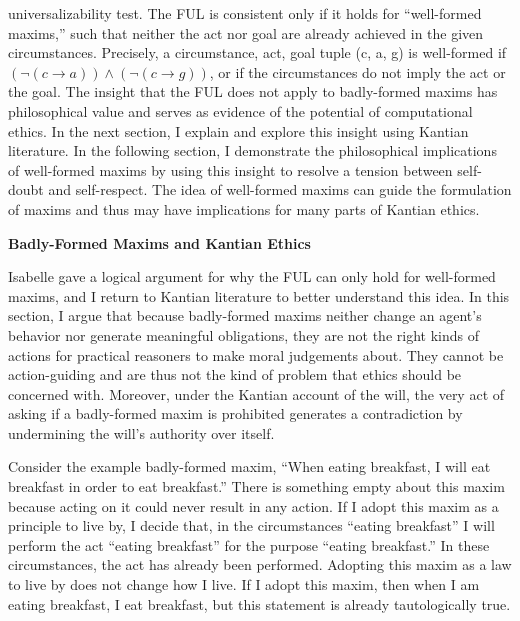 \begin{isabellebody}
\begin{isamarkuptext}
universalizability test. The FUL is consistent only if it holds for ``well-formed maxims,''
such that neither the act nor goal are already achieved in the given circumstances. Precisely, 
a circumstance, act, goal tuple (c, a, g) is well-formed if $(\neg (c \longrightarrow a) ) \wedge 
(\neg(c \longrightarrow g))$, or if the circumstances do not imply the act or the goal. The insight
that the FUL does not apply to badly-formed maxims has philosophical value and serves as evidence 
of the potential of computational ethics. In the next section, I explain and explore this insight using 
Kantian literature. In the following section, I demonstrate the philosophical implications of well-formed
maxims by using this insight to resolve a tension between self-doubt and self-respect. The idea of well-formed
maxims can guide the formulation of maxims and thus may have implications for many parts of Kantian ethics.

\noindent \textbf{Badly-Formed Maxims and Kantian Ethics}

Isabelle gave a logical argument for why the FUL can only hold for well-formed maxims, and I return to Kantian
literature to better understand this idea. In this section, I argue that 
because badly-formed maxims
neither change an agent's behavior nor generate meaningful obligations, they are not the right kinds of 
actions for practical reasoners to make moral judgements about. They cannot be action-guiding and are thus not the kind of problem that 
ethics should be concerned with. Moreover, under the Kantian account of the will, the very act of asking 
if a badly-formed maxim is prohibited generates a contradiction by undermining the will's authority over itself. 

Consider the example badly-formed maxim, ``When eating breakfast, I will eat breakfast in order to 
eat breakfast.'' There is something empty about this maxim because acting on it could never result in 
any action. If I adopt this maxim as a principle to live by,
I decide that, in the circumstances ``eating breakfast'' I will perform the act ``eating breakfast''
for the purpose ``eating breakfast.'' In these circumstances, the act has 
already been performed. Adopting this maxim as a law to live by does not change how I live. If I adopt 
this maxim, then when I am eating breakfast, I eat breakfast, but this statement is already tautologically true. 


\end{isamarkuptext}
\end{isabellebody}
